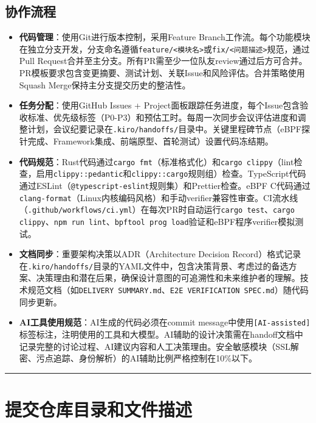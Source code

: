 \documentclass[a4paper]{ctexart}
\makeatletter
\renewcommand{\_}{%
  \ifmmode
    \nfss@text{\textunderscore}%
  \else
    \textunderscore\discretionary{}{}{}%
  \fi}
\makeatother
\begin{document}
\subsection{协作流程}



\begin{itemize}
\item \textbf{代码管理}：使用Git进行版本控制，采用Feature Branch工作流。每个功能模块在独立分支开发，分支命名遵循\texttt{feature/<模块名>}或\texttt{fix/<问题描述>}规范，通过Pull Request合并至主分支。所有PR需至少一位队友review通过后方可合并。PR模板要求包含变更摘要、测试计划、关联Issue和风险评估。合并策略使用Squash Merge保持主分支提交历史的整洁性。
\item \textbf{任务分配}：使用GitHub Issues + Project面板跟踪任务进度，每个Issue包含验收标准、优先级标签（P0-P3）和预估工时。每周一次同步会议评估进度和调整计划，会议纪要记录在\texttt{.kiro/handoffs/}目录中。关键里程碑节点（eBPF探针完成、Framework集成、前端原型、首轮测试）设置代码冻结期。
\item \textbf{代码规范}：Rust代码通过\texttt{cargo fmt}（标准格式化）和\texttt{cargo clippy}（lint检查，启用\texttt{clippy::pedantic}和\texttt{clippy::cargo}规则组）检查。TypeScript代码通过ESLint（\texttt{@typescript-eslint}规则集）和Prettier检查。eBPF C代码通过\texttt{clang-format}（Linux内核编码风格）和手动verifier兼容性审查。CI流水线（\texttt{.github/workflows/ci.yml}）在每次PR时自动运行\texttt{cargo test}、\texttt{cargo clippy}、\texttt{npm run lint}、\texttt{bpftool prog load}验证和eBPF程序verifier模拟测试。
\item \textbf{文档同步}：重要架构决策以ADR（Architecture Decision Record）格式记录在\texttt{.kiro/handoffs/}目录的YAML文件中，包含决策背景、考虑过的备选方案、决策理由和潜在后果，确保设计意图的可追溯性和未来维护者的理解。技术规范文档（如\texttt{DELIVERY\_SUMMARY.md}、\texttt{E2E\_VERIFICATION\_SPEC.md}）随代码同步更新。
\item \textbf{AI工具使用规范}：AI生成的代码必须在commit message中使用\texttt{[AI-assisted]}标签标注，注明使用的工具和大模型。AI辅助的设计决策需在handoff文档中记录完整的讨论过程、AI建议内容和人工决策理由。安全敏感模块（SSL解密、污点追踪、身份解析）的AI辅助比例严格控制在10\%以下。
\end{itemize}

\bigskip
\hrule
\bigskip


\section{提交仓库目录和文件描述}
\end{document}
